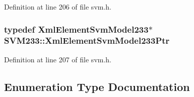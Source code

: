 Definition at line 206 of file svm.\+h.

\subsubsection[{\texorpdfstring{Xml\+Element\+Svm\+Model233\+Ptr}{XmlElementSvmModel233Ptr}}]{\setlength{\rightskip}{0pt plus 5cm}typedef {\bf Xml\+Element\+Svm\+Model233}$\ast$ {\bf S\+V\+M233\+::\+Xml\+Element\+Svm\+Model233\+Ptr}}\hypertarget{namespace_s_v_m233_afcdf865b0b4b533ca407830b3dbb6ef1}{}\label{namespace_s_v_m233_afcdf865b0b4b533ca407830b3dbb6ef1}


Definition at line 207 of file svm.\+h.



\subsection{Enumeration Type Documentation}
